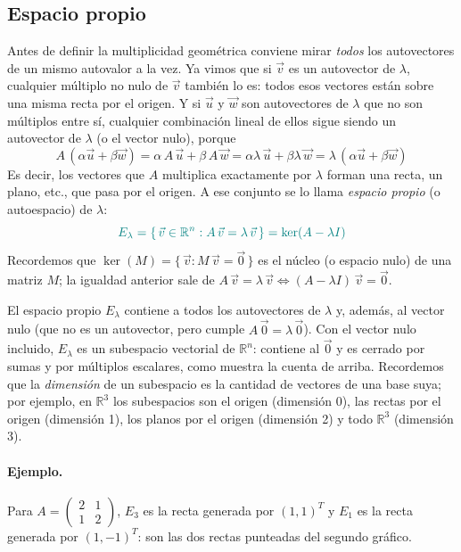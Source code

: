 \documentclass{article}
\newcommand{\vect}[1]{\vec{#1}}
\begin{document}
\subsection*{Espacio propio}

Antes de definir la multiplicidad geométrica conviene mirar \emph{todos} los autovectores de un mismo autovalor a la vez. Ya vimos que si \(\vect{v}\) es un autovector de \(\lambda\), cualquier múltiplo no nulo de \(\vect{v}\) también lo es: todos esos vectores están sobre una misma recta por el origen. Y si \(\vect{u}\) y \(\vect{w}\) son autovectores de \(\lambda\) que no son múltiplos entre sí, cualquier combinación lineal de ellos sigue siendo un autovector de \(\lambda\) (o el vector nulo), porque
\[
A\,(\alpha \vect{u}+\beta \vect{w})=\alpha\,A\,\vect{u}+\beta\,A\,\vect{w}=\alpha\lambda\,\vect{u}+\beta\lambda\,\vect{w}=\lambda\,(\alpha \vect{u}+\beta \vect{w})
\]
Es decir, los vectores que \(A\) multiplica exactamente por \(\lambda\) forman una recta, un plano, etc., que pasa por el origen. A ese conjunto se lo llama \emph{espacio propio} (o autoespacio) de \(\lambda\):
\[ \color{teal}
E_\lambda=\{\,\vect{v}\in\mathbb{R}^n : A\,\vect{v}=\lambda\,\vect{v}\,\}=\ker(A-\lambda I)
\]
Recordemos que \(\ker(M)=\{\,\vect{v} : M\,\vect{v}=\vect{0}\,\}\) es el núcleo (o espacio nulo) de una matriz \(M\); la igualdad anterior sale de \(A\,\vect{v}=\lambda\,\vect{v}\Leftrightarrow(A-\lambda I)\,\vect{v}=\vect{0}\).

El espacio propio \(E_\lambda\) contiene a todos los autovectores de \(\lambda\) y, además, al vector nulo (que no es un autovector, pero cumple \(A\,\vect{0}=\lambda\,\vect{0}\)). Con el vector nulo incluido, \(E_\lambda\) es un subespacio vectorial de \(\mathbb{R}^n\): contiene al \(\vect{0}\) y es cerrado por sumas y por múltiplos escalares, como muestra la cuenta de arriba. Recordemos que la \emph{dimensión} de un subespacio es la cantidad de vectores de una base suya; por ejemplo, en \(\mathbb{R}^3\) los subespacios son el origen (dimensión 0), las rectas por el origen (dimensión 1), los planos por el origen (dimensión 2) y todo \(\mathbb{R}^3\) (dimensión 3).

\paragraph*{Ejemplo.} Para \(A=\begin{pmatrix}2&1\\1&2\end{pmatrix}\), \(E_3\) es la recta generada por \((1,1)^T\) y \(E_1\) es la recta generada por \((1,-1)^T\): son las dos rectas punteadas del segundo gráfico.
\end{document}
